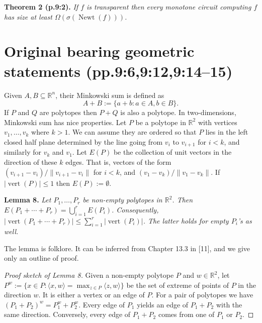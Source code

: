 \documentclass[10pt,a4paper]{article}
\newcommand{\Newt}{\operatorname{Newt}}
\newcommand{\vertset}{\operatorname{vert}}
\newenvironment{sourceresult}[1]{\par\medskip\noindent\textbf{#1.}\itshape}{\par\medskip}
\begin{document}
\begin{sourceresult}{Theorem 2 (p.9:2)}
If $f$ is transparent then every monotone circuit computing $f$ has size at least $\Omega(\sigma(\Newt(f)))$.
\end{sourceresult}

\section*{Original bearing geometric statements (pp.9:6,9:12,9:14--15)}
Given $A,B\subseteq\mathbb R^n$, their Minkowski sum is defined as
\[A+B:=\{a+b:a\in A,b\in B\}.\]
If $P$ and $Q$ are polytopes then $P+Q$ is also a polytope. In two-dimensions, Minkowski sum has nice properties. Let $P$ be a polytope in $\mathbb R^2$ with vertices $v_1,\ldots,v_k$ where $k>1$. We can assume they are ordered so that $P$ lies in the left closed half plane determined by the line going from $v_i$ to $v_{i+1}$ for $i<k$, and similarly for $v_k$ and $v_1$. Let $E(P)$ be the collection of unit vectors in the direction of these $k$ edges. That is, vectors of the form $(v_{i+1}-v_i)/\|v_{i+1}-v_i\|$ for $i<k$, and $(v_1-v_k)/\|v_1-v_k\|$. If $|\vertset(P)|\le1$ then $E(P):=\emptyset$.
\begin{sourceresult}{Lemma 8}
Let $P_1,\ldots,P_r$ be non-empty polytopes in $\mathbb R^2$. Then $E(P_1+\cdots+P_r)=\bigcup_{i=1}^r E(P_i)$. Consequently, $|\vertset(P_1+\cdots+P_r)|\le\sum_{i=1}^r|\vertset(P_i)|$. The latter holds for empty $P_i$'s as well.
\end{sourceresult}
The lemma is folklore. It can be inferred from Chapter 13.3 in [11], and we give only an outline of proof.
\begin{proof}[Proof sketch of Lemma 8]
Given a non-empty polytope $P$ and $w\in\mathbb R^2$, let $P^w:=\{x\in P:\langle x,w\rangle=\max_{z\in P}\langle z,w\rangle\}$ be the set of extreme of points of $P$ in the direction $w$. It is either a vertex or an edge of $P$. For a pair of polytopes we have $(P_1+P_2)^w=P_1^w+P_2^w$. Every edge of $P_1$ yields an edge of $P_1+P_2$ with the same direction. Conversely, every edge of $P_1+P_2$ comes from one of $P_1$ or $P_2$.
\end{proof}
\end{document}
